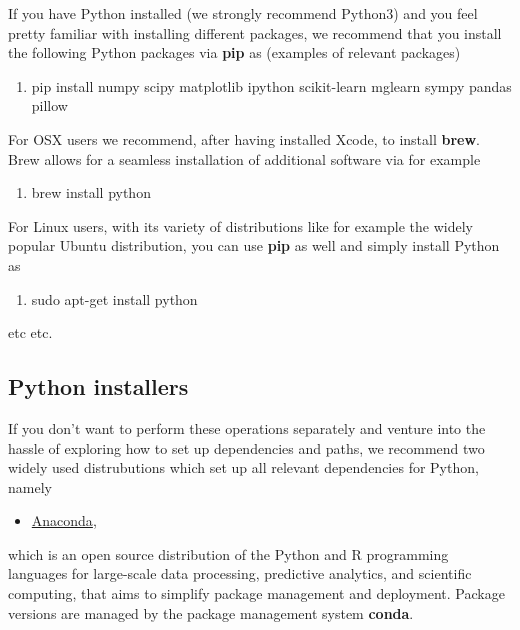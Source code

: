 \documentclass[%
oneside,                 %
final,                   %
10pt]{article}
\begin{document}
If you have Python installed (we strongly recommend Python3) and you feel
pretty familiar with installing different packages, we recommend that
you install the following Python packages via \textbf{pip} as (examples of relevant packages)

\begin{enumerate}
\item pip install numpy scipy matplotlib ipython scikit-learn mglearn sympy pandas pillow 
\end{enumerate}

\noindent
For OSX users we recommend, after having installed Xcode, to
install \textbf{brew}. Brew allows for a seamless installation of additional
software via for example 

\begin{enumerate}
\item brew install python
\end{enumerate}

\noindent
For Linux users, with its variety of distributions like for example the widely popular Ubuntu distribution,
you can use \textbf{pip} as well and simply install Python as 

\begin{enumerate}
\item sudo apt-get install python
\end{enumerate}

\noindent
etc etc. 


\subsection*{Python installers}

If you don't want to perform these operations separately and venture
into the hassle of exploring how to set up dependencies and paths, we
recommend two widely used distrubutions which set up all relevant
dependencies for Python, namely 

\begin{itemize}
\item \href{{https://docs.anaconda.com/}}{Anaconda}, 
\end{itemize}

\noindent
which is an open source
distribution of the Python and R programming languages for large-scale
data processing, predictive analytics, and scientific computing, that
aims to simplify package management and deployment. Package versions
are managed by the package management system \textbf{conda}. 
\end{document}
